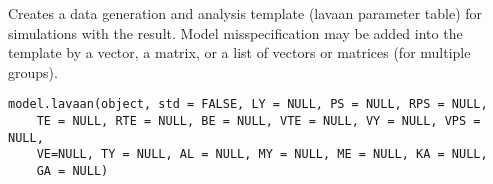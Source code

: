 \documentclass[a4paper]{book}
\begin{document}
%
\begin{Description}\relax
Creates a data generation and analysis template (lavaan parameter table) for simulations with the  result. Model misspecification may be added into the template by a vector, a matrix, or a list of vectors or matrices (for multiple groups). 
\end{Description}
%
\begin{Usage}
\begin{verbatim}
model.lavaan(object, std = FALSE, LY = NULL, PS = NULL, RPS = NULL, 
	TE = NULL, RTE = NULL, BE = NULL, VTE = NULL, VY = NULL, VPS = NULL, 
	VE=NULL, TY = NULL, AL = NULL, MY = NULL, ME = NULL, KA = NULL, 
	GA = NULL)
\end{verbatim}
\end{Usage}
%
\end{document}
